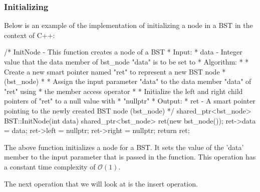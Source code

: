 \begin{highlight}

\subsubsection*{Initializing}

Below is an example of the implementation of initializing a node in a BST in the context of C++:

\begin{code}
/*  InitNode - This function creates a node of a BST
*   Input:
*     data - Integer value that the data member of bst_node "data" is to be set to
*   Algorithm:
*     * Create a new smart pointer named "ret" to represent a new BST node 
*       (bst_node)
*     * Assign the input parameter "data" to the data member "data" of "ret" using 
*       the member access operator
*     * Initialize the left and right child pointers of "ret" to a null value with 
*       "nullptr"
*   Output:
*     ret - A smart pointer pointing to the newly created BST node (bst_node)
*/
shared_ptr<bst_node> BST::InitNode(int data){
    shared_ptr<bst_node> ret(new bst_node());
    ret->data = data;
    ret->left = nullptr;
    ret->right = nullptr;
    return ret;
}
\end{code}

The above function initializes a node for a BST. It sets the value of the 'data' member to the input parameter that is passed in the function. This operation has a constant time complexity of 
$\mathcal{O}(1)$.

\end{highlight}

The next operation that we will look at is the insert operation.

